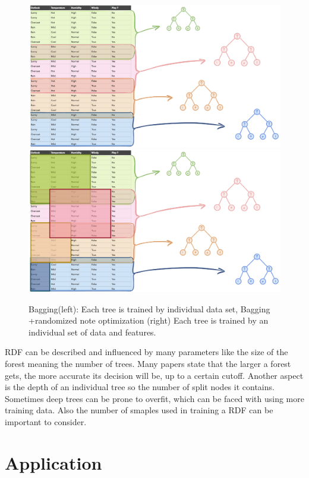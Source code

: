 \documentclass[
12pt,
headsepline,
bibliography=totoc,
twoside=semi,
fleqn
]{scrartcl}
\begin{document}
 \begin{figure}[H]
 \includegraphics[scale=0.4]{BDT12.png}\label{fig:fig12}
 \includegraphics[scale=0.4]{BDT13.png}\label{fig:fig13}
 \caption{Bagging(left): Each tree is trained by individual data set, Bagging +randomized note optimization (right) Each tree is trained by an individual set of data and features.}

 \end{figure}

RDF can be described and influenced by many parameters like the size of the forest meaning the number of trees. Many papers state that the larger a forest gets, the more accurate its decision will be, up to a certain cutoff. Another aspect is the depth of an individual tree so the number of split nodes it contains. Sometimes deep trees can be prone to overfit, which can be faced with using more training data. Also the number of smaples used in training a RDF can be important to consider.


\section{Application\label{sec:sec3}}
\end{document}
